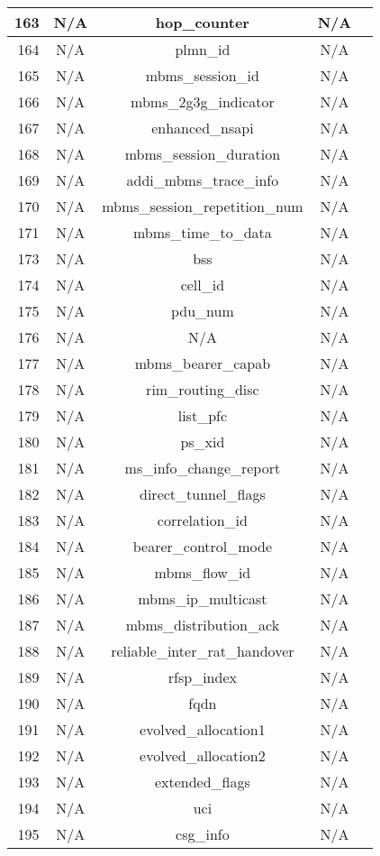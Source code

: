 \documentclass[english]{report}
\begin{document}
\begin{itemize}
\begin{longtable}{|r|c|c|c|p{13.5cm}|}
\hline
163 & N/A & hop\_counter & N/A\\
\hline
164 & N/A & plmn\_id & N/A\\
\hline
165 & N/A & mbms\_session\_id & N/A\\
\hline
166 & N/A & mbms\_2g3g\_indicator & N/A\\
\hline
167 & N/A & enhanced\_nsapi & N/A\\
\hline
168 & N/A & mbms\_session\_duration & N/A\\
\hline
169 & N/A & addi\_mbms\_trace\_info & N/A\\
\hline
170 & N/A & mbms\_session\_repetition\_num & N/A\\
\hline
171 & N/A & mbms\_time\_to\_data & N/A\\
\hline
173 & N/A & bss & N/A\\
\hline
174 & N/A & cell\_id & N/A\\
\hline
175 & N/A & pdu\_num & N/A\\
\hline
176 & N/A & N/A & N/A\\
\hline
177 & N/A & mbms\_bearer\_capab & N/A\\
\hline
178 & N/A & rim\_routing\_disc & N/A\\
\hline
179 & N/A & list\_pfc & N/A\\
\hline
180 & N/A & ps\_xid & N/A\\
\hline
181 & N/A & ms\_info\_change\_report & N/A\\
\hline
182 & N/A & direct\_tunnel\_flags & N/A\\
\hline
183 & N/A & correlation\_id & N/A\\
\hline
184 & N/A & bearer\_control\_mode & N/A\\
\hline
185 & N/A & mbms\_flow\_id & N/A\\
\hline
186 & N/A & mbms\_ip\_multicast & N/A\\
\hline
187 & N/A & mbms\_distribution\_ack & N/A\\
\hline
188 & N/A & reliable\_inter\_rat\_handover & N/A\\
\hline
189 & N/A & rfsp\_index & N/A\\
\hline
190 & N/A & fqdn & N/A\\
\hline
191 & N/A & evolved\_allocation1 & N/A\\
\hline
192 & N/A & evolved\_allocation2 & N/A\\
\hline
193 & N/A & extended\_flags & N/A\\
\hline
194 & N/A & uci & N/A\\
\hline
195 & N/A & csg\_info & N/A\\

\end{longtable}
\end{itemize}
\end{document}
